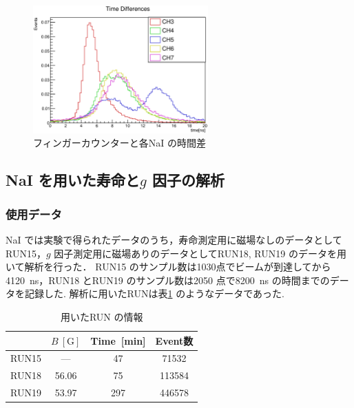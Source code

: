 \begin{figure}[hbt]
\centering
\includegraphics[width=0.6\textwidth]{figure/hatano/coincidence.eps}
\caption{フィンガーカウンターと各NaI の時間差}
\label{hatano_fig:coincidence}
\end{figure}


\subsection{NaI を用いた寿命と$g$ 因子の解析}
\subsubsection{使用データ}
NaI では実験で得られたデータのうち，寿命測定用に磁場なしのデータとしてRUN15，$g$ 因子測定用に磁場ありのデータとしてRUN18, RUN19 のデータを用いて解析を行った．
RUN15 のサンプル数は1030点でビームが到達してから4120~ns，RUN18 とRUN19 のサンプル数は2050 点で8200~ns の時間までのデータを記録した.
解析に用いたRUNは表\ref{tab:RUN_info} のようなデータであった.

\begin{table}[H]%
\caption{用いたRUN の情報}
\centering
\begin{tabular}{cccc}\toprule
{} & $B~[\mathrm{G}]$ & Time~[min] & Event数\\ \midrule
RUN15 & --- & 47 & 71532 \\
RUN18 & 56.06 & 75 & 113584 \\
RUN19 & 53.97 & 297 & 446578 \\ \bottomrule
\end{tabular}
\label{tab:RUN_info}
\end{table}

